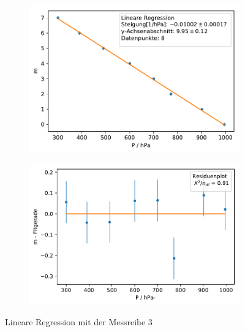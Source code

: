 \documentclass[12pt,a4paper]{article}
\begin{document}
\begin{figure}[H]
	\centering	
	\begin{subfigure}{0.49\textwidth}
		\centering
		\includegraphics[width=\textwidth]{Python/MR3_LinReg.pdf}
	\end{subfigure}
	\begin{subfigure}{0.49\textwidth}
		\centering
		\includegraphics[width=\textwidth]{Python/MR3_Residuen.pdf}
	\end{subfigure}
	\caption{Lineare Regression mit der Messreihe 3}
	\label{MR3_LinReg}
\end{figure}
\end{document}
